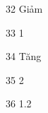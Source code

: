 \begin{loigiaibt}{32}
 Giảm
\end{loigiaibt}
\begin{loigiaibt}{33}
 1
\end{loigiaibt}
\begin{loigiaibt}{34}
 Tăng
\end{loigiaibt}
\begin{loigiaibt}{35}
 2
\end{loigiaibt}
\begin{loigiaibt}{36}
 1.2
\end{loigiaibt}
